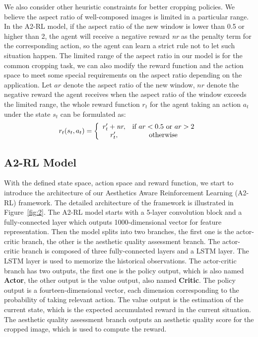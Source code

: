 \documentclass[10pt,twocolumn,letterpaper]{article}
\begin{document}
We also consider other heuristic constraints for better cropping policies. We believe the aspect ratio of well-composed images is limited in a particular range. In the A2-RL model, if the aspect ratio of the new window is lower than 0.5 or higher than 2, the agent will receive a negative reward \emph{nr} as the penalty term for the corresponding action, so the agent can learn a strict rule not to let such situation happen. The limited range of the aspect ratio in our model is for the common cropping task, we can also modify the reward function and the action space to meet some special requirements on the aspect ratio depending on the application.  Let $ar$ denote the aspect ratio of the new window, $nr$ denote the negative reward the agent receives when the aspect ratio of the window exceeds the limited range, the whole reward function $r_t$ for the agent taking an action $a_t$ under the state $s_t$ can be formulated as:
\begin{equation}
r_t(s_t, a_t) = \left\{\begin{array}{cc}
r_t' + \emph{nr},&\mbox{if $ar<0.5$ or  $ar>2$}\\
r_t',&\mbox{otherwise}
\end{array}
\right.
\label{r}
\end{equation}
\subsection{A2-RL Model}
With the defined state space, action space and reward function, we start to introduce the architecture of our Aesthetics Aware Reinforcement Learning (A2-RL) framework. The detailed architecture of the framework is illustrated in Figure~\ref{fig:2}. The A2-RL model starts with a 5-layer convolution block and a fully-connected layer which outputs 1000-dimensional vector for feature representation. Then the model splits into two branches, the first one is the actor-critic branch, the other is the aesthetic quality assessment branch. The actor-critic branch is composed of three fully-connected layers and a LSTM layer. The LSTM layer is used to memorize the historical observations. The actor-critic branch has two outputs, the first one is the policy output, which is also named \textbf{Actor}, the other output is the value output, also named \textbf{Critic}. The policy output is a fourteen-dimensional vector, each dimension corresponding to the probability of taking relevant action. The value output is the estimation of the current state, which is the expected accumulated reward in the current situation. The aesthetic quality assessment branch outputs an aesthetic quality score for the cropped image, which is used to compute the reward.
\end{document}
